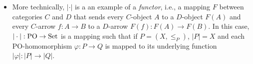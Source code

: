 \begin{itemize}
\item More technically, $| \cdot |$ is a an example of a \emph{functor}, i.e., a mapping $F$ between categories
$C$ and $D$ that sends every $C$-object $A$ to a $D$-object $F(A)$ and every $C$-arrow $f : A \to B$ to 
a $D$-arrow $F(f) : F(A) \to F(B)$. In this case, $| \cdot | : \mathrm{PO} \to \mathrm{Set}$ is a mapping such that if
$P = (X, \leq_P)$, $|P| = X$ and each PO-homomorphism $\varphi : P \to Q$ is mapped to its underlying function $|\varphi| : |P| \to |Q|$.

\end{itemize}
